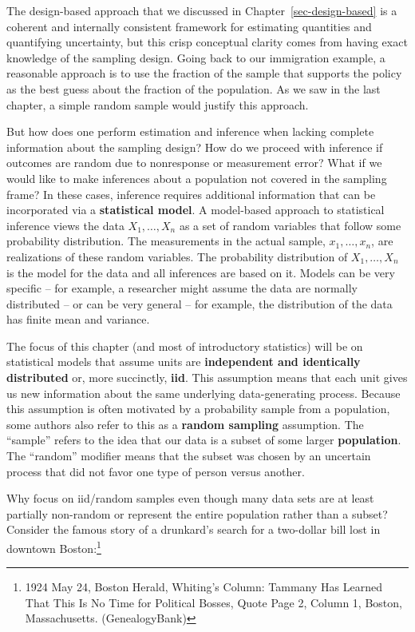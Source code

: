 \documentclass[
  13pt,
  letterpaper,
  DIV=11,
  numbers=noendperiod]{scrreprt}
\theoremstyle{plain}
\theoremstyle{plain}
\theoremstyle{definition}
\theoremstyle{definition}
\theoremstyle{remark}
\begin{document}
The design-based approach that we discussed in
Chapter~\ref{sec-design-based} is a coherent and internally consistent
framework for estimating quantities and quantifying uncertainty, but
this crisp conceptual clarity comes from having exact knowledge of the
sampling design. Going back to our immigration example, a reasonable
approach is to use the fraction of the sample that supports the policy
as the best guess about the fraction of the population. As we saw in the
last chapter, a simple random sample would justify this approach.

But how does one perform estimation and inference when lacking complete
information about the sampling design? How do we proceed with inference
if outcomes are random due to nonresponse or measurement error? What if
we would like to make inferences about a population not covered in the
sampling frame? In these cases, inference requires additional
information that can be incorporated via a \textbf{statistical model}. A
model-based approach to statistical inference views the data
\(X_1,\ldots, X_n\) as a set of random variables that follow some
probability distribution. The measurements in the actual sample,
\(x_1, \ldots, x_n\), are realizations of these random variables. The
probability distribution of \(X_1,\ldots, X_n\) is the model for the
data and all inferences are based on it. Models can be very specific --
for example, a researcher might assume the data are normally distributed
-- or can be very general -- for example, the distribution of the data
has finite mean and variance.

The focus of this chapter (and most of introductory statistics) will be
on statistical models that assume units are \textbf{independent and
identically distributed} or, more succinctly, \textbf{iid}. This
assumption means that each unit gives us new information about the same
underlying data-generating process. Because this assumption is often
motivated by a probability sample from a population, some authors also
refer to this as a \textbf{random sampling} assumption. The ``sample''
refers to the idea that our data is a subset of some larger
\textbf{population}. The ``random'' modifier means that the subset was
chosen by an uncertain process that did not favor one type of person
versus another.

Why focus on iid/random samples even though many data sets are at least
partially non-random or represent the entire population rather than a
subset? Consider the famous story of a drunkard's search for a
two-dollar bill lost in downtown Boston:\footnote{1924 May 24, Boston
  Herald, Whiting's Column: Tammany Has Learned That This Is No Time for
  Political Bosses, Quote Page 2, Column 1, Boston, Massachusetts.
  (GenealogyBank)}
\end{document}

